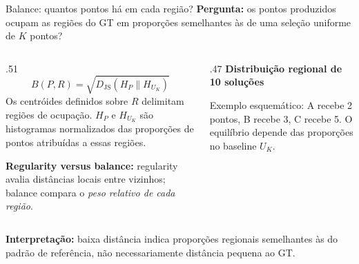 \begin{frame}{Balance: quantos pontos há em cada região?}
\textbf{Pergunta:} os pontos produzidos ocupam as regiões do GT em proporções semelhantes às de uma seleção uniforme de $K$ pontos?
\begin{columns}[T,onlytextwidth]
\begin{column}{.51\textwidth}
\[
\boxed{\displaystyle
B(P,R)=\sqrt{D_{\mathrm{JS}}(H_P\parallel H_{U_K})}}
\]
Os centróides definidos sobre $R$ delimitam regiões de ocupação. $H_P$ e $H_{U_K}$ são histogramas normalizados das proporções de pontos atribuídas a essas regiões.
\par\medskip
\textbf{Regularity versus balance:} regularity avalia distâncias locais entre vizinhos; balance compara o \emph{peso relativo de cada região}.
\end{column}
\begin{column}{.47\textwidth}\centering
\textbf{Distribuição regional de 10 soluções}\par\medskip
{}
\scriptsize Exemplo esquemático: A recebe 2 pontos, B recebe 3, C recebe 5. O equilíbrio depende das proporções no baseline $U_K$.
\end{column}
\end{columns}
\vspace{.06cm}\textbf{Interpretação:} baixa distância indica proporções regionais semelhantes às do padrão de referência, não necessariamente distância pequena ao GT.
\end{frame}

